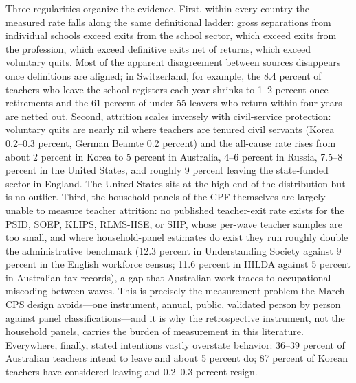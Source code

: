 \documentclass[11pt,a4paper]{article}
\begin{document}
Three regularities organize the evidence. First, within every country
the measured rate falls along the same definitional ladder: gross
separations from individual schools exceed exits from the school
sector, which exceed exits from the profession, which exceed
definitive exits net of returns, which exceed voluntary quits. Most
of the apparent disagreement between sources disappears once
definitions are aligned; in Switzerland, for example, the 8.4 percent
of teachers who leave the school registers each year shrinks to 1--2
percent once retirements and the 61 percent of under-55 leavers who
return within four years are netted out. Second, attrition scales
inversely with civil-service protection: voluntary quits are nearly
nil where teachers are tenured civil servants (Korea 0.2--0.3 percent,
German Beamte 0.2 percent) and the all-cause rate rises from about 2
percent in Korea to 5 percent in Australia, 4--6 percent in Russia,
7.5--8 percent in the United States, and roughly 9 percent leaving the
state-funded sector in England. The United States sits at the high end
of the distribution but is no outlier. Third, the household panels of
the CPF themselves are largely unable to measure teacher attrition:
no published teacher-exit rate exists for the PSID, SOEP, KLIPS,
RLMS-HSE, or SHP, whose per-wave teacher samples are too small, and
where household-panel estimates do exist they run roughly double the
administrative benchmark (12.3 percent in Understanding Society
against 9 percent in the English workforce census; 11.6 percent in
HILDA against 5 percent in Australian tax records), a gap that
Australian work traces to occupational miscoding between waves. This
is precisely the measurement problem the March CPS design
avoids---one instrument, annual, public, validated person by person
against panel classifications---and it is why the retrospective
instrument, not the household panels, carries the burden of
measurement in this literature. Everywhere, finally, stated intentions
vastly overstate behavior: 36--39 percent of Australian teachers
intend to leave and about 5 percent do; 87 percent of Korean teachers
have considered leaving and 0.2--0.3 percent resign.
\end{document}
